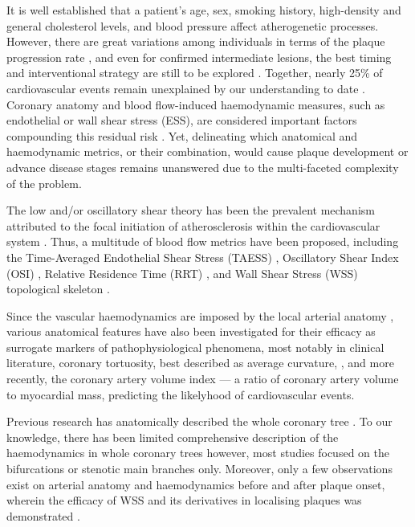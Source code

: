 \documentclass[preprint,11pt,review]{elsarticle}
\begin{document}
It is well established that a patient’s age, sex, smoking history, high-density and general cholesterol levels, and blood pressure affect atherogenetic processes. However, there are great variations among individuals in terms of the plaque progression rate \cite{indraratna2022plaque}, and even for confirmed intermediate lesions, the best timing and interventional strategy are still to be explored \cite{benatti2023timing}. Together, nearly 25\% of cardiovascular events remain unexplained by our understanding to date \cite{damen_performance_2019}. Coronary anatomy and blood flow-induced haemodynamic measures, such as endothelial or wall shear stress (ESS), are considered important factors compounding this residual risk \cite{Morbiducci2016Atherosclerosis}. Yet, delineating which anatomical and haemodynamic metrics, or their combination, would cause plaque development or advance disease stages remains unanswered due to the multi-faceted complexity of the problem.  

The low and/or oscillatory shear theory has been the prevalent mechanism attributed to the focal initiation of atherosclerosis within the cardiovascular system \cite{Peiffer2013Does}. Thus, a multitude of blood flow metrics have been proposed, including the Time-Averaged Endothelial Shear Stress (TAESS) \cite{Hartman2021definition,dai2019Associations}, Oscillatory Shear Index (OSI) \cite{Morbiducci2016Atherosclerosis, Ku1985Pulsatile}, Relative Residence Time (RRT) \cite{Hoi2011Correlation}, and Wall Shear Stress (WSS) topological skeleton \cite{Morbiducci2020Wall, Chiastra2022Coronary}. 

Since the vascular haemodynamics are imposed by the local arterial anatomy \cite{Morbiducci2016Atherosclerosis}, various anatomical features have also been investigated for their efficacy as surrogate markers of pathophysiological phenomena, most notably in clinical literature, coronary tortuosity, best described as average curvature,  \cite{Kashyap2022Accuracy,Han2022Association}, and more recently, the coronary artery volume index \cite{Benetos2020Coronary} — a
ratio of coronary artery volume to myocardial mass, predicting the likelyhood of cardiovascular events.

Previous research has anatomically described the whole coronary tree \cite{Medrano-Gracia2016computational}. To our knowledge, there has been limited comprehensive description of the haemodynamics in whole coronary trees however, most studies focused on the bifurcations \cite{Medrano-Gracia2016computational} or stenotic main branches \cite{stone_prediction_2012} only. Moreover, only a few observations exist on arterial anatomy and haemodynamics before and after plaque onset, wherein the efficacy of WSS and its derivatives in localising plaques was demonstrated  \cite{Knight2010Choosing,Rikhtegar2012Choosing}. 
\end{document}
